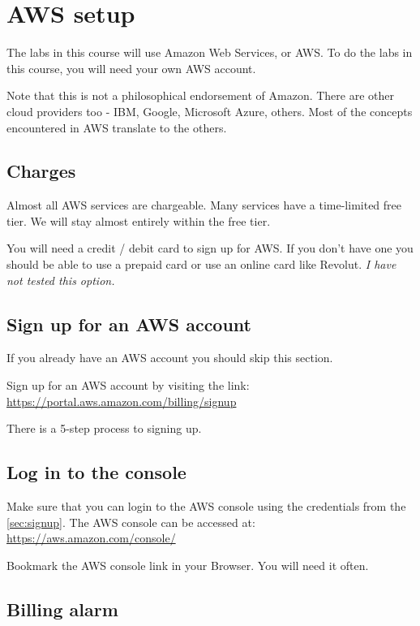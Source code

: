 \chapter{AWS setup}
\label{ch:aws-setup}

The labs in this course will use Amazon Web Services, or AWS.
To do the labs in this course, you will need your own AWS account.

Note that this is not a philosophical endorsement of Amazon.
There are other cloud providers too - IBM, Google, Microsoft Azure, others.
Most of the concepts encountered in AWS translate to the others.

\section{Charges}
\label{sec:charges}

Almost all AWS services are chargeable.
Many services have a time-limited free tier.
We will stay almost entirely within the free tier. 

You will need a credit / debit card to sign up for AWS.
If you don't have one you should be able to use a prepaid card or use an online card like Revolut.
\textit{I have not tested this option.}

\section{Sign up for an AWS account}
\label{sec:signup}

If you already have an AWS account you should skip this section.

Sign up for an AWS account by visiting the link:\\
\url{https://portal.aws.amazon.com/billing/signup}

There is a 5-step process to signing up.

\section{Log in to the console}

Make sure that you can login to the AWS console using the credentials from the \autoref{sec:signup}.
The AWS console can be accessed at:\\
\url{https://aws.amazon.com/console/}

Bookmark the AWS console link in your Browser. You will need it often.

\section{Billing alarm}

